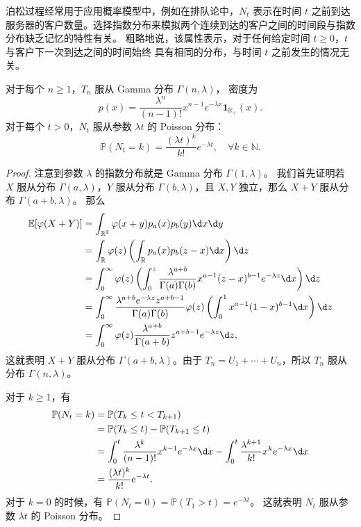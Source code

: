 \documentclass[fontset=none]{Notes}
\newcommand{\indicator}[1]{\mathbold 1_{#1}}
\begin{document}
泊松过程经常用于应用概率模型中，例如在排队论中，$N_t$ 表示在时间 $t$ 之前到达
服务器的客户数量。选择指数分布来模拟两个连续到达的客户之间的时间段与指数分布缺乏记忆的特性有关。
粗略地说，该属性表示，对于任何给定时间 $t \geq 0$，$t$ 与客户下一次到达之间的时间始终
具有相同的分布，与时间 $t$ 之前发生的情况无关。

\begin{proposition}
  对于每个 $n\geq 1$，$T_n$ 服从 Gamma 分布 $\Gamma(n,\lambda)$，
  密度为
  \[
    p(x)=\frac{\lambda^n}{(n-1)!}x^{n-1}e^{-\lambda x}\indicator{\mathbb{R}_+}(x).  
  \]
  对于每个 $t> 0$，$N_t$ 服从参数 $\lambda t$ 的 Poisson 分布：
  \[
    \mathbb{P}(N_t=k)=\frac{(\lambda t)^k}{k!}e^{-\lambda t},
    \quad \forall k\in \mathbb{N} . 
  \]
\end{proposition}
\begin{proof}
  注意到参数 $\lambda$ 的指数分布就是 Gamma 分布 $\Gamma(1,\lambda)$。
  我们首先证明若 $X$ 服从分布 $\Gamma(a,\lambda)$，$Y$
  服从分布 $\Gamma(b,\lambda)$，且 $X,Y$ 独立，那么 $X+Y$
  服从分布 $\Gamma(a+b,\lambda)$。
  那么
  \begin{align*}
    \mathbb{E}[\varphi(X+Y)]&=\int_{\mathbb{R}^2}
    \varphi(x+y)p_a(x)p_b(y)\d x\d y\\
    &=\int_{\mathbb{R}}\varphi(z)\left(\int_{\mathbb{R}}p_a(x)p_b(z-x)\d x\right)\d z\\
    &=\int_0^\infty\varphi(z)\left(\int_{0}^z
    \frac{\lambda^{a+b}}{\Gamma(a)\Gamma(b)}x^{a-1}
    (z-x)^{b-1}e^{-\lambda z}\d x\right) \d z\\
    &=\int_0^\infty \frac{\lambda^{a+b}e^{-\lambda z}z^{a+b-1}}{\Gamma(a)\Gamma(b)}
    \varphi(z)\left(\int_0^1 x^{a-1}(1-x)^{b-1}\d x\right)\d z\\
    &=\int_0^\infty \varphi(z)\frac{\lambda^{a+b}}{\Gamma(a+b)}
    z^{a+b-1}e^{-\lambda z}\d z,
  \end{align*}
  这就表明 $X+Y$ 服从分布 $\Gamma(a+b,\lambda)$。由于
  $T_n=U_1+\cdots+U_n$，所以 $T_n$ 服从分布 $\Gamma(n,\lambda)$。

  对于 $k\geq 1$，有
  \begin{align*}
    \mathbb{P}(N_t=k)&=\mathbb{P}(T_k\leq t< T_{k+1})\\
    &=\mathbb{P}(T_{k}\leq t)-\mathbb{P}(T_{k+1}\leq t)\\
    &=\int_0^t \frac{\lambda^k}{(n-1)!}x^{k-1}e^{-\lambda x}\d x
    -\int_0^t \frac{\lambda^{k+1}}{k!}x^{k}e^{-\lambda x}\d x\\
    &=\frac{(\lambda t)^k}{k!}e^{-\lambda t}.
  \end{align*}
  对于 $k=0$ 的时候，有
  $\mathbb{P}(N_t=0)=\mathbb{P}(T_1>t)=e^{-\lambda t}$。
  这就表明 $N_t$ 服从参数 $\lambda t$ 的 Poisson 分布。
\end{proof}
\end{document}
